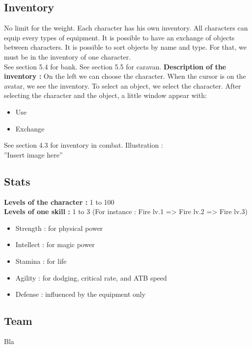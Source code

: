 \documentclass[a4paper,12pt]{book}
\begin{document}
\subsection{Inventory}
No limit for the weight. Each character has his own inventory. All characters can equip every types of equipment. It is possible to have an exchange of objects between characters. It is possible to sort objects by name and type. For that, we must be in the inventory of one character. \\
See section 5.4 for bank.
See section 5.5 for caravan.
\textbf{Description of the inventory :} On the left we can choose the character. When the cursor is on the avatar, we see the inventory. To select an object, we select the character. After selecting the character and the object, a little window appear with:
\begin{itemize}
	\item Use
	\item Exchange
\end{itemize}
See section 4.3 for inventory in combat.
Illustration : \\ ''Insert image here''
\subsection{Stats}
\textbf{Levels of the character :} 1 to 100 \\
\textbf{Levels of one skill :} 1 to 3 \newpage (For instance : Fire lv.1 => Fire lv.2 => Fire lv.3)
\begin{itemize}
	\item Strength : for physical power
	\item Intellect : for magic power
	\item Stamina : for life
	\item Agility : for dodging, critical rate, and ATB speed
	\item Defense : influenced by the equipment only
\end{itemize}
\subsection{Team}
Bla
\end{document}
